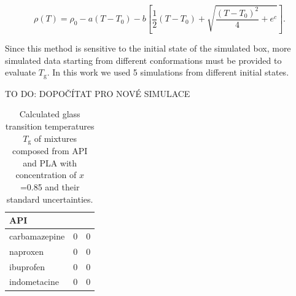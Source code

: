 \begin{equation}\label{eq:fit}
	\rho(T)=\rho_0-a\left(T-T_0\right)-b\left[\frac{1}{2}\left(T-T_0\right)+\sqrt{\frac{\left(T-T_0\right)^2}{4}+e^c}\right].
\end{equation}

Since this method is sensitive to the initial state of the simulated box, more simulated data starting from different conformations must be provided to evaluate $T_\text{g}$. In this work we used 5 simulations from different initial states.

TO DO: DOPOČÍTAT PRO NOVÉ SIMULACE
\begin{table}[htb!]
	\caption{Calculated glass transition temperatures $T_\text{g}$ of mixtures composed from API and PLA with concentration of $x$=0.85 and their standard uncertainties.}
	\centering
	\begin{tabular}{lcc} \toprule
		{\textbf{API}} & {\textbf{\boldmath{$T_{\text{g}}$}}} & \textbf{{\boldmath{$\sigma_{T_\text{g}}$}}} \\
		\midrule
		carbamazepine  & 0 & 0 \\		
		naproxen   & 0 & 0 \\
		ibuprofen  & 0 & 0 \\
		indometacine  & 0 & 0 \\
		\bottomrule
	\end{tabular}
	\label{tab:Tg_mix} 
\end{table} 


